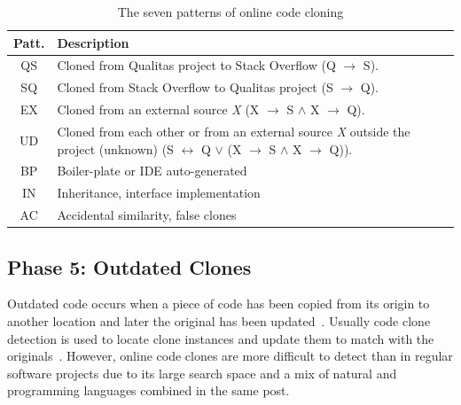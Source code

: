 \documentclass[sigconf,review, anonymous]{acmart}
\begin{document}
\begin{table}
	\centering
	\caption{The seven patterns of online code cloning}
	\label{tab:classification_scheme}
        \small\vspace{-1ex}
		\begin{tabular}{c@{~~}p{7.35cm}}
			\hline 
			Patt. & Description \\ 
			\hline 
			QS & Cloned from Qualitas project to Stack Overflow (Q $\rightarrow$ S). \\ 

			SQ &Cloned from Stack Overflow to Qualitas project (S $\rightarrow$ Q). \\ 

			EX & Cloned from an external source \textit{X} (X $\rightarrow$ S $\wedge$ X $\rightarrow$ Q). \\

			UD & Cloned from each other or from an external source \textit{X} outside the project (unknown) (S $\leftrightarrow$ Q $\vee$ (X $\rightarrow$ S $\wedge$ X $\rightarrow$ Q)). \\ 
			\hline 
			BP & Boiler-plate or IDE auto-generated \\ 

			IN & Inheritance, interface implementation  \\ 

			AC & Accidental similarity, false clones \\ 
			\hline 
		\end{tabular}  %
\end{table}

\subsection{Phase 5: Outdated Clones}
Outdated code occurs when a piece of code has been copied from its
origin to another location and later the original has been
updated~\cite{Xia2014}. Usually code clone detection is used to locate
clone instances and update them to match with the
originals~\cite{Bellon2007}. However, online code clones are more
difficult to detect than in regular software projects due to its large
search space and a mix of natural and programming languages combined
in the same post.
\end{document}
